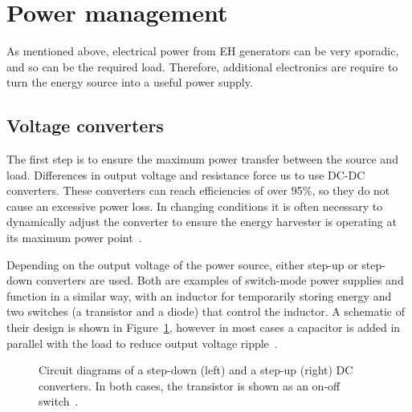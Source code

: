 \documentclass[a4paper,10pt]{article}
\begin{document}
\section{Power management}

As mentioned above, electrical power from \ac{EH} generators can be very sporadic, and so can be the required load. Therefore, additional electronics are require to turn the energy source into a useful power supply. 

\subsection{Voltage converters}

The first step is to ensure the maximum power transfer between the source and load. Differences in output voltage and resistance force us to use DC-DC converters. These converters can reach efficiencies of over 95\%, so they do not cause an excessive power loss. In changing conditions it is often necessary to dynamically adjust the converter to ensure the energy harvester is operating at its maximum power point~\cite{solar-mppt-ieee}. 

Depending on the output voltage of the power source, either step-up or step-down converters are used. Both are examples of switch-mode power supplies and function in a similar way, with an inductor for temporarily storing energy and two switches (a transistor and a diode) that control the inductor. A schematic of their design is shown in Figure~\ref{fig:converters}, however in most cases a capacitor is added in parallel with the load to reduce output voltage ripple~\cite{wiki:dcdc}. 

\begin{figure}[h!]
\centering
\caption{Circuit diagrams of a step-down (left) and a step-up (right) DC converters. In both cases, the transistor is shown as an on-off switch~\cite{wiki:dcdc}.}
\label{fig:converters}
\end{figure}
\end{document}
